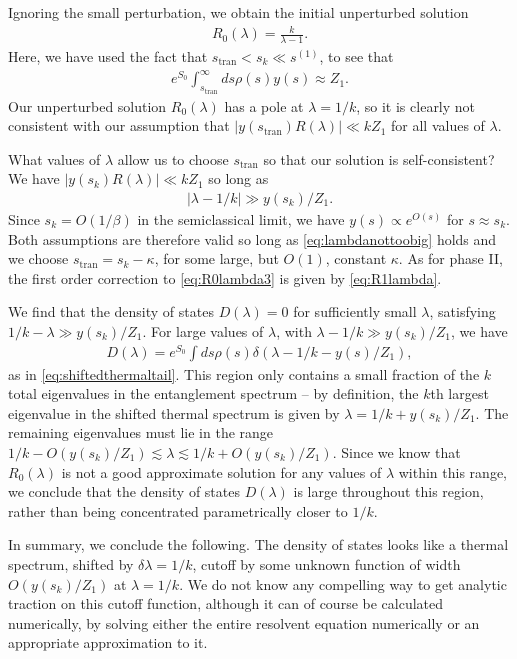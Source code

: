 \documentclass[11pt]{article}
\newcommand{\stran}{s_{\text{tran}}}
\newcommand{\smax}{s_k}
\numberwithin{equation}{section}
\begin{document}
Ignoring the small perturbation, we obtain the initial unperturbed solution
\begin{align} \label{eq:R0lambda3}
R_0 (\lambda) = \frac{k}{\lambda - 1}.
\end{align}
Here, we have used the fact that $\stran < \smax \ll s^{(1)}$, to see that
\begin{align}
e^{S_0} \int_{\stran}^\infty ds \rho(s) y(s)  \approx Z_1.
\end{align}
Our unperturbed solution $R_0(\lambda)$ has a pole at $\lambda = 1/k$, so it is clearly not consistent with our assumption that $|y(\stran) R(\lambda)| \ll k Z_1$ for all values of $\lambda$. 

What values of $\lambda$ allow us to choose $\stran$ so that our solution is self-consistent? We have  $|y(\smax) R(\lambda)| \ll k Z_1$ so long as
\begin{align} \label{eq:lambdanottoobig}
\left|\lambda - 1/k\right| \gg y(\smax)/Z_1.
\end{align}
Since $\smax = O(1/\beta)$ in the semiclassical limit, we have $y(s) \propto e^{O(s)}$  for $s \approx \smax$. Both assumptions are therefore valid so long as \eqref{eq:lambdanottoobig} holds and we choose $\stran =\smax - \kappa$, for some large, but $O(1)$, constant $\kappa$. As for phase II, the first order correction to \eqref{eq:R0lambda3} is given by \eqref{eq:R1lambda}. 

We find that the density of states $D(\lambda) = 0$ for sufficiently small $\lambda$, satisfying $1/k - \lambda \gg y(\smax)/Z_1$. For large values of $\lambda$, with $\lambda - 1/k \gg y(\smax)/Z_1$, we have
\begin{align}
D(\lambda) = e^{S_0} \int ds \rho(s) \delta( \lambda - 1/k - y(s)/ Z_1),
\end{align}
as in \eqref{eq:shiftedthermaltail}. This region only contains a small fraction of the $k$ total eigenvalues in the entanglement spectrum -- by definition, the $k$th largest eigenvalue in the shifted thermal spectrum is given by $ \lambda = 1/k + y(\smax)/Z_1$. The remaining eigenvalues must lie in the range $1/k - O(y(\smax)/Z_1) \lesssim \lambda \lesssim 1/k + O(y(\smax)/Z_1)$. Since we know that $R_0 (\lambda)$ is not a good approximate solution for any values of $\lambda$ within this range, we conclude that the density of states $D(\lambda)$ is large throughout this region, rather than being concentrated parametrically closer to $1/k$. 

In summary, we conclude the following. The density of states looks like a thermal spectrum, shifted by $\delta \lambda = 1/k$, cutoff by some unknown function of width $O(y(\smax)/Z_1)$ at $\lambda = 1/k$. We do not know any compelling way to get analytic traction on this cutoff function, although it can of course be calculated numerically, by solving either the entire resolvent equation numerically or an appropriate approximation to it. 
\end{document}
